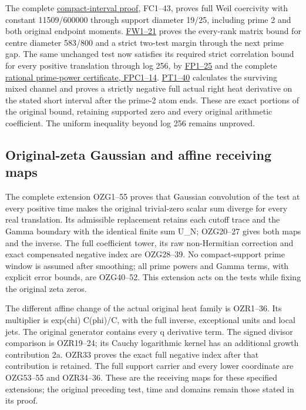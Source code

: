 \documentclass[
  10pt,
  a4paper,
]{article}
\begin{document}
The complete \href{FIRST_PRIME_FULL_WEIL_COERCIVITY.md}{compact-interval
proof}, FC1--43, proves full Weil coercivity with constant 11509/600000
through support diameter 19/25, including prime 2 and both original
endpoint moments. \href{FIRST_PRIME_WINDOW_BOUND.md}{FW1--21} proves the
every-rank matrix bound for centre diameter 583/800 and a strict
two-test margin through the next prime gap. The same unchanged test now
satisfies its required strict correlation bound for every positive
translation through log 256, by
\href{FINITE_PRIME_WINDOW_EXTENSION.md}{FP1--25} and the complete
\href{FINITE_PRIME_WINDOW_COEFFICIENT_CERTIFICATE.md}{rational
prime-power certificate, FPC1--14}.
\href{PRIME_TWO_HEAT_TAIL_DERIVATION.md}{PT1--40} calculates the
surviving mixed channel and proves a strictly negative full actual right
heat derivative on the stated short interval after the prime-2 atom
ends. These are exact portions of the original bound, retaining
supported zero and every original arithmetic coefficient. The uniform
inequality beyond log 256 remains unproved.

\subsection{Original-zeta Gaussian and affine receiving
maps}\label{original-zeta-gaussian-and-affine-receiving-maps}

The complete extension OZG1--55 proves that Gaussian convolution of the
test at every positive time makes the original trivial-zero scalar sum
diverge for every real translation. Its admissible replacement retains
each cutoff trace and the Gamma boundary with the identical finite sum
U\_N; OZG20--27 gives both maps and the inverse. The full coefficient
tower, its raw non-Hermitian correction and exact compensated negative
index are OZG28--39. No compact-support prime window is assumed after
smoothing; all prime powers and Gamma terms, with explicit error bounds,
are OZG40--52. This extension acts on the tests while fixing the
original zeta zeros.

The different affine change of the actual original heat family is
OZR1--36. Its multiplier is exp(chi) C(phi)/C, with the full inverse,
exceptional units and local jets. The original generator contains every
q derivative term. The signed divisor comparison is OZR19--24; its
Cauchy logarithmic kernel has an additional growth contribution 2a.
OZR33 proves the exact full negative index after that contribution is
retained. The full support carrier and every lower coordinate are
OZG53--55 and OZR34--36. These are the receiving maps for these
specified extensions; the original preceding test, time and domains
remain those stated in its proof.
\end{document}
